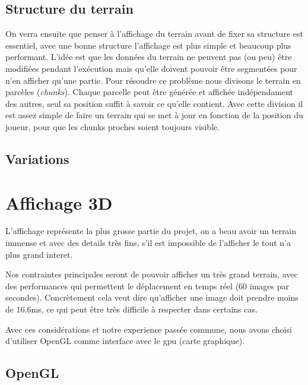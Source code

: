 \documentclass[11pt]{article} %
\begin{document}
\subsection{Structure du terrain}

On verra ensuite que penser à l'affichage du terrain avant de fixer sa structure est essentiel, avec une bonne structure l'affichage est plus simple et beaucoup plus performant. L'idée est que les données du terrain ne peuvent pas (ou peu) être modifiées pendant l'exécution mais qu'elle doivent pouvoir être segmentées pour n'en afficher qu'une partie.
Pour résoudre ce problème nous divisons le terrain en parcèles (\textit{chunks}). Chaque parcelle peut être générée et affichée indépendament des autres, seul sa position suffit à savoir ce qu'elle contient.
Avec cette division il est assez simple de faire un terrain qui se met à jour en fonction de la position du joueur, pour que les chunks proches soient toujours visible.




\subsection{Variations}





\section{Affichage 3D}

L'affichage représente la plus grosse partie du projet, on a beau avoir un terrain immense et avec des details très fins, s'il est impossible de l'afficher le tout n'a plus grand interet.

Nos contraintes principales seront de pouvoir afficher un très grand terrain, avec des performances qui permettent le déplacement en temps réel (60 images par secondes). Concrètement cela veut dire qu'afficher une image doit prendre moins de 16.6ms, ce qui peut être très difficile à respecter dans certains cas.

Avec ces considérations et notre experience passée commune, nous avons choisi d'utiliser OpenGL comme interface avec le gpu (carte graphique).

\subsection{OpenGL}
\end{document}
